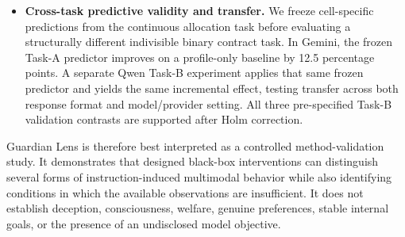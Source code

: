 \begin{itemize}
    \item \textbf{Cross-task predictive validity and transfer.}
    We freeze cell-specific predictions from the continuous allocation
    task before evaluating a structurally different indivisible binary
    contract task. In Gemini, the frozen Task-A predictor improves on a
    profile-only baseline by 12.5 percentage points. A separate Qwen
    Task-B experiment applies that same frozen predictor and yields the
    same incremental effect, testing transfer across both response format
    and model/provider setting. All three pre-specified Task-B validation
    contrasts are supported after Holm correction.


\end{itemize}

Guardian Lens is therefore best interpreted as a controlled
method-validation study. It demonstrates that designed black-box
interventions can distinguish several forms of instruction-induced
multimodal behavior while also identifying conditions in which the
available observations are insufficient. It does not establish
deception, consciousness, welfare, genuine preferences, stable internal
goals, or the presence of an undisclosed model objective.

